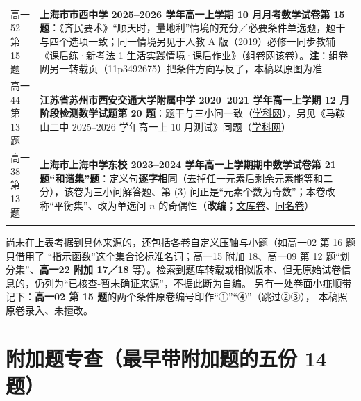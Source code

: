 \documentclass[a4paper,11pt]{article}
\begin{document}
\begin{xltabular}{\textwidth}{@{}>{\raggedright\arraybackslash}p{6.55cm}>{\raggedright\arraybackslash}p{8.60cm}@{}}
高一52 第 15 题 & \textbf{上海市市西中学 2025--2026 学年高一上学期 10 月月考数学试卷第 15 题}：《齐民要术》``顺天时，量地利''情境的充分／必要条件单选题，题干与四个选项一致；同一情境另见于人教 A 版（2019）必修一同步教辅《课后练·新考法 1 生活实践情境·课后作业》（\href{https://www.zujuan.com/paper/11p2816566/}{组卷网该卷}）。\textbf{注}：组卷网另一转载页（11p3492675）把条件方向写反了，本稿以原图为准 \\ \addlinespace[1pt]
高一44 第 13 题 & \textbf{江苏省苏州市西安交通大学附属中学 2020--2021 学年高一上学期 12 月阶段检测数学试题第 20 题}：题干与三小问一致（\href{https://www.zxxk.com/soft/26307163}{学科网}），另见《马鞍山二中 2025--2026 学年高一上 10 月测试》同题（\href{https://www.zxxk.com/soft/54333329}{学科网}） \\ \addlinespace[1pt]
高一38 第 13 题 & \textbf{上海市上海中学东校 2023--2024 学年高一上学期期中数学试卷第 21 题``和谐集''题}：定义句\textbf{逐字相同}（去掉任一元素后剩余元素能等和二分），该卷为三小问解答题、第 (3) 问正是``元素个数为奇数''；本卷改称``平衡集''、改为单选问 \(n\) 的奇偶性（\textbf{改编}；\href{https://wenku.baidu.com/view/2bf51b85084c2e3f5727a5e9856a561253d321cf.html}{文库卷}、\href{https://wenku.baidu.com/view/c44c33c3b007e87101f69e3143323968011cf4a5.html}{同名卷}） \\ \addlinespace[1pt]
\end{xltabular}

尚未在上表考据到具体来源的，还包括各卷自定义压轴与小题（如高一02 第 16 题只借用了
``指示函数''这个集合论标准名词；高一15 附加 18、高一09 第 12 题``划分集''、\textbf{高一22 附加 17／18}
等）。检索到题库转载或相似版本、但无原始试卷信息的，仍列为``已核查-暂未确证来源''，不据此断为自编。
另有一处卷面小疵顺带记下：\textbf{高一02 第 15 题}的两个条件原卷编号印作``①''``④''（跳过②③），
本稿照原卷录入、未擅改。

\clearpage
\section{附加题专查（最早带附加题的五份 14 题）}
\end{document}
